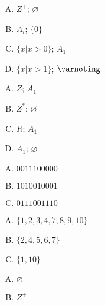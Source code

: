 {{        %
        \begin{practices}
            \begin{enumerate}[A.]
                \item $Z^+$; $\varnothing$
                \item $A_i$; $\{0\}$
                \item $\{x | x > 0\}$; $A_1$
                \item $\{x | x > 1\}$; $\varnoting$
            \end{enumerate}
        \end{practices}

        \begin{practices}
            \begin{enumerate}[A.]
                \item $Z$; $A_1$
                \item $Z^*$; $\varnothing$
                \item $R$; $A_1$
                \item $A_1$; $\varnothing$
            \end{enumerate}
        \end{practices}

        \begin{practices}
            \begin{enumerate}[A.]
                \item $0011 1000 00$
                \item $1010 0100 01$
                \item $0111 0011 10$
            \end{enumerate}
        \end{practices}

        \begin{practices}
            \begin{enumerate}[A.]
                \item $\{1, 2, 3, 4, 7, 8, 9, 10\}$
                \item $\{2, 4, 5, 6, 7\}$
                \item $\{1, 10\}$
            \end{enumerate}
        \end{practices}

        \begin{practices}
            \begin{enumerate}[A.]
                \item $\varnothing$
                \item $Z^+$
            \end{enumerate}
        \end{practices}

}}
